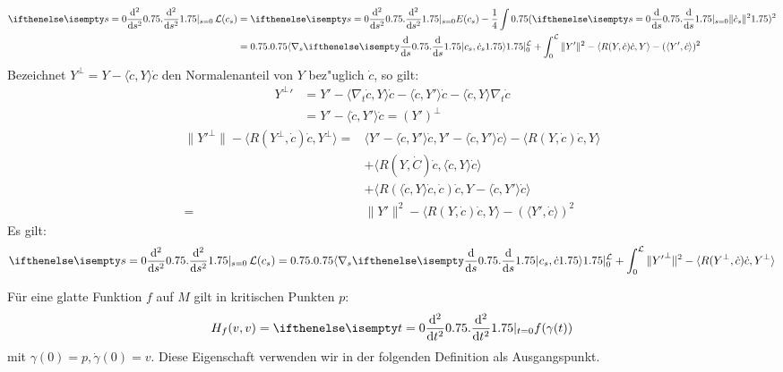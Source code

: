 \begin{align*}
  \difffrac[s=0]{^2}{s^2} \calL(c_s) &= \difffrac[s=0]{^2}{s^2} E(c_s) - \frac{1}{4} \int \left( \difffrac[s=0]{}{s} \| \dot c_s \|^2 \right)^2 \\
  &= \left.\left\langle \nabla_s \difffrac{}{s} c_s, \dot c_s
    \right\rangle\right|_{0}^{\calL} + \int_0^{\calL} \| Y' \|^2 -
  \langle R(Y, \dot c) \dot c, Y \rangle - ( \langle Y', \dot c
  \rangle )^2
\end{align*}
Bezeichnet $Y^\perp = Y - \langle \dot c, Y \rangle \dot c$ den
Normalenanteil von $Y$ bez"uglich $\dot c$, so gilt:
\begin{align*}
  {Y^\perp}' &= Y' - \langle \nabla_t \dot c, Y \rangle \dot c - \langle \dot c, Y' \rangle \dot c - \langle \dot c, Y \rangle \nabla_t \dot c \\
  &= Y' - \langle \dot c, Y' \rangle \dot c = (Y')^\perp
\end{align*}
\begin{align*}
  \| {Y'}^\perp \| - \langle R(Y^\perp, \dot c) \dot c, Y^\perp \rangle ={}& \langle Y' - \langle \dot c, Y' \rangle \dot c, Y' - \langle \dot c, Y' \rangle \dot c \rangle - \langle R(Y, \dot c) \dot c, Y \rangle \\
  & + \langle R(Y, \dot C) \dot c, \langle \dot c, Y \rangle \dot c \rangle \\
  & + \langle R ( \langle \dot c, Y \rangle \dot c, \dot c) \dot c, Y - \langle \dot c, Y' \rangle \dot c \rangle \\
  ={}& \| Y' \|^2 - \langle R(Y, \dot c) \dot c, Y \rangle - ( \langle
  Y', \dot c \rangle )^2
\end{align*}
Es gilt:
\begin{align*}
  \difffrac[s=0]{^2}{s^2} \calL(c_s) = \left.\left\langle \nabla_s
      \difffrac{}{s} c_s, \dot c \right\rangle\right|_{0}^{\calL} +
  \int_0^{\calL} \| {Y'}^\perp \|^2 - \langle R(Y^\perp, \dot c) \dot
  c, Y^\perp \rangle
\end{align*}


\begin{emptythm}[Erinnerung]
  Für eine glatte Funktion $f$ auf $M$ gilt in kritischen Punkten $p$:
  \begin{align*}
    H_f(v,v) = \difffrac[t=0]{^2}{t^2}f(\gamma(t))
  \end{align*}
  mit $\gamma(0) = p, \dot\gamma(0) = v$.
  Diese Eigenschaft verwenden wir in der folgenden Definition als Ausgangspunkt.
\end{emptythm}

